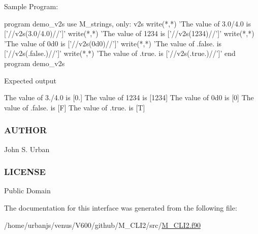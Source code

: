 Sample Program\+: \begin{DoxyVerb}program demo_v2s
use M_strings, only: v2s
write(*,*) 'The value of 3.0/4.0 is ['//v2s(3.0/4.0)//']'
write(*,*) 'The value of 1234    is ['//v2s(1234)//']'
write(*,*) 'The value of 0d0     is ['//v2s(0d0)//']'
write(*,*) 'The value of .false. is ['//v2s(.false.)//']'
write(*,*) 'The value of .true. is  ['//v2s(.true.)//']'
end program demo_v2s
\end{DoxyVerb}


Expected output

The value of 3./4.0 is \mbox{[}0.\mbox{]} The value of 1234 is \mbox{[}1234\mbox{]} The value of 0d0 is \mbox{[}0\mbox{]} The value of .false. is \mbox{[}F\mbox{]} The value of .true. is \mbox{[}T\mbox{]}

\subsubsection*{A\+U\+T\+H\+OR}

John S. Urban \subsubsection*{L\+I\+C\+E\+N\+SE}

Public Domain 

The documentation for this interface was generated from the following file\+:\begin{DoxyCompactItemize}
\item 
/home/urbanjs/venus/\+V600/github/\+M\+\_\+\+C\+L\+I2/src/\mbox{\hyperlink{M__CLI2_8f90}{M\+\_\+\+C\+L\+I2.\+f90}}\end{DoxyCompactItemize}
